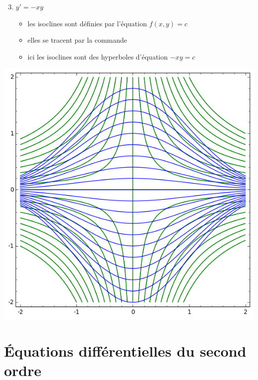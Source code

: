 \begin{frame}  

\begin{enumerate}
\setcounter{enumi}{2}
  \item $y' = -xy$
  \begin{itemize}
    \item les isoclines sont définies par l'équation $f(x,y) = c$
    \pause
    \item elles se tracent par la commande \\
  \centerline{}
  \pause
    \item ici les isoclines sont des hyperboles  d'équation $-xy=c$
  \end{itemize}
\end{enumerate}
\begin{center}  
\includegraphics[scale=0.4]{figures/equadiff-courbe4.png}
\end{center}
\end{frame}



\section{\'Equations différentielles du second ordre}

